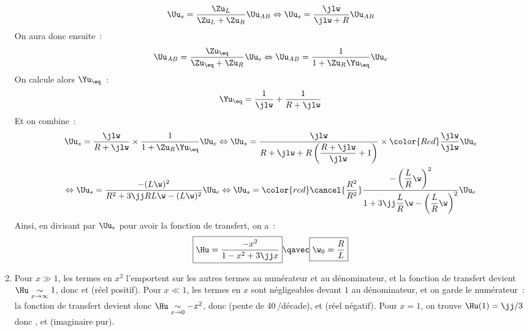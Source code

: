 \documentclass[a4paper, 12pt, final, garamond]{book}
\begin{document}
\begin{enumerate}
        \begin{gather*}
            \Uu_s = \frac{\Zu_L}{\Zu_L + \Zu_R}\Uu_{AB}
            \Leftrightarrow
            \Uu_s = \frac{\jlw}{\jlw + R}\Uu_{AB}
        \end{gather*}
        On aura donc ensuite~:
        \begin{gather*}
            \Uu_{AB} = \frac{\Zu_{\eq}}{\Zu_{\eq} + \Zu_R}\Uu_e
            \Leftrightarrow
            \Uu_{AB} = \frac{1}{1+\Zu_R\Yu_{\eq}}\Uu_e
        \end{gather*}
        On calcule alors $\Yu_{\eq}$~:
        \begin{gather*}
            \Yu_{\eq} = \frac{1}{\jlw} + \frac{1}{R+\jlw}
        \end{gather*}
        Et on combine~:
        \begin{gather*}
            \Uu_s =
                \frac{\jlw}{R+\jlw}\times\frac{1}{1+\Zu_R\Yu_{\eq}}\Uu_e
            \Leftrightarrow
            \Uu_s =
                \frac{\jlw}{R + \jlw + R \left( \dfrac{R+\jlw}{\jlw} + 1
                \right)}\times {\color{Red} \frac{\jlw}{\jlw}}\Uu_e\\
            \Leftrightarrow
            \Uu_s =
                \frac{-(L\w)^2}{R^2 + 3\jj RL\w - (L\w)^2}\Uu_e
            \Leftrightarrow
            \Uu_s =
                {\color{red}\cancel{\frac{R^2}{R^2}}}
                \frac{- \left( \dfrac{L}{R}\w \right)^2}{1 + 3\jj \dfrac{L}{R}\w
                - \left( \dfrac{L}{R}\w \right)^2}
                \Uu_e
        \end{gather*}
        Ainsi, en divisant par $\Uu_e$ pour avoir la fonction de transfert, on
        a~:
        \begin{gather*}
            \boxed{\Hu = \frac{-x^2}{1-x^2+3\jj x}}
            \qavec
            \boxed{\w_0 = \frac{R}{L}}
        \end{gather*}
    \item Pour $x \gg 1$, les termes en $x^2$ l'emportent sur les autres termes
        au numérateur et au dénominateur, et la fonction de transfert devient
        $\Hu \underset{x\rightarrow\infty}{\sim} 1$, donc 
        et  (réel positif). \bigbreak
        Pour $x \ll 1$, les termes en $x$ sont négligeables devant $1$ au
        dénominateur, et on garde le numérateur~: la fonction de transfert
        devient donc $\Hu \underset{x\rightarrow0}{\sim} -x^2$, donc
         (pente de
        40\,\dB/décade), et \fbox{$\f = -\pi$} (réel négatif). \bigbreak
        Pour $x = 1$, on trouve $\Hu(1) = \jj/3$ donc , et  (imaginaire pur).
\end{enumerate}
\end{document}
